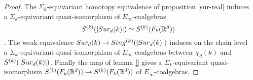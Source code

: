 \begin{proof}
	The $\Sigma_k$-equivariant homotopy equivalence of proposition \ref{sur-real} induces a $\Sigma_k$-equivariant quasi-isomorphism of $E_{\infty}$-coalgebras
	$$S^{(k)}(\lvert Sur_d(k)\rvert) \simeq S^{(k)}(F_k(\mathbb{R}^d))$$.
	The weak equivalence %
	$Sur_d(k) \to Sing^{(k)}(\lvert Sur_d(k)\rvert)$ induces on the chain level a $\Sigma_k$-equivariant quasi-isomorphism of
	$E_\infty$-coalgebras
	between $\chi_d(k)$
	and $S^{(k)}(\lvert Sur_d(k)\rvert)$.
	Finally the map of lemma \ref{} gives a $\Sigma_k$-equivariant quasi-isomorphism $S^{(1)}(F_k(\mathbb{R}^d)) \to S^{(k)}(F_k(\mathbb{R}^d))$ of $E_\infty$-coalgebras.
\end{proof}
